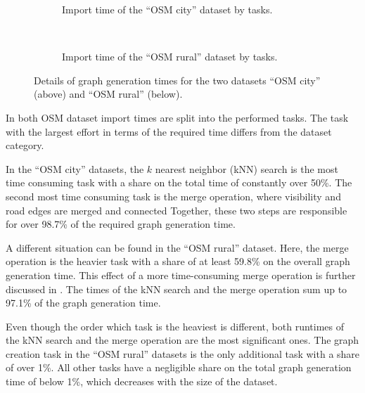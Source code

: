			\begin{figure}[h!]
				\begin{figcenter}
					\begin{subfigure}[t]{\textwidth}
						\begin{figcenter}
							
						\end{figcenter}
						\caption{Import time of the \enquote{OSM city} dataset by tasks.}
					\end{subfigure}
					\\[3ex]
					\begin{subfigure}[t]{\textwidth}
						\begin{figcenter}
							
						\end{figcenter}
						\caption{Import time of the \enquote{OSM rural} dataset by tasks.}
					\end{subfigure}
				\end{figcenter}
				\caption{Details of graph generation times for the two datasets \enquote{OSM city} (above) and \enquote{OSM rural} (below).}
				\label{fig:eval-import-details}
			\end{figure}
			
			In  both OSM dataset import times are split into the performed tasks.
			The task with the largest effort in terms of the required time differs from the dataset category.
			
			In the \enquote{OSM city} datasets, the $k$ nearest neighbor (kNN) search is the most time consuming task with a share on the total time of constantly over 50\%.
			The second most time consuming task is the merge operation, where visibility and road edges are merged and connected
			Together, these two steps are responsible for over 98.7\% of the required graph generation time.
			
			A different situation can be found in the \enquote{OSM rural} dataset.
			Here, the merge operation is the heavier task with a share of at least 59.8\% on the overall graph generation time.
			This effect of a more time-consuming merge operation is further discussed in .
			The times of the kNN search and the merge operation sum up to 97.1\% of the graph generation time.
			
			Even though the order which task is the heaviest is different, both runtimes of the kNN search and the merge operation are the most significant ones.
			The graph creation task in the \enquote{OSM rural} datasets is the only additional task with a share of over 1\%.
			All other tasks have a negligible share on the total graph generation time of below 1\%, which decreases with the size of the dataset.
	
